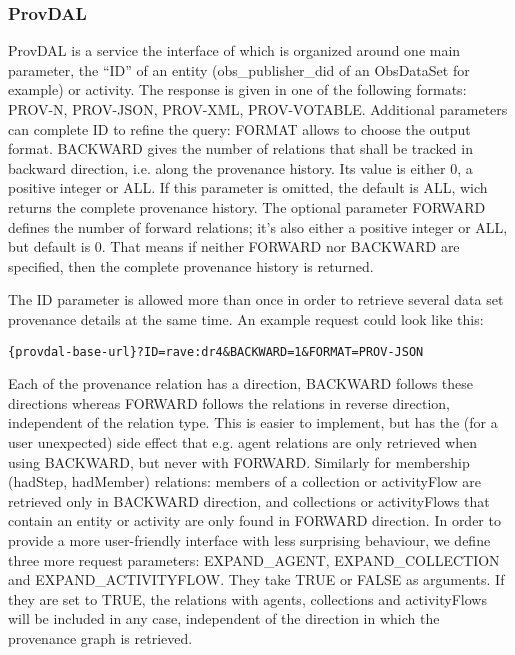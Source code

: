 \subsubsection{ProvDAL}
ProvDAL is a service the interface of which is organized around one main parameter, the ``ID'' of an entity (obs\_publisher\_did of an ObsDataSet for example) or activity. The response is given in one of the following formats: PROV-N, PROV-JSON, PROV-XML, PROV-VOTABLE. Additional parameters can complete ID to refine the query: FORMAT allows to choose the output format. BACKWARD gives the number of relations that shall be tracked in backward direction, i.e. along the provenance history. Its value is either 0, a positive integer or ALL. If this parameter is omitted, the default is ALL, wich returns the complete provenance history.
The optional parameter FORWARD defines the number of forward relations; it's also either a positive integer or ALL, but default is 0. That means if neither FORWARD nor BACKWARD are specified, then the complete provenance history is returned.



The ID parameter is allowed more than once in order to retrieve several data set provenance details at the same time. An example request could look like this:

\begin{verbatim}
{provdal-base-url}?ID=rave:dr4&BACKWARD=1&FORMAT=PROV-JSON
\end{verbatim}

Each of the provenance relation has a direction, BACKWARD follows these directions whereas FORWARD follows the relations in reverse direction, independent of the relation type. This is easier to implement, but has the (for a user unexpected) side effect that e.g. agent relations are only retrieved when using BACKWARD, but never with FORWARD. Similarly for membership (hadStep, hadMember) relations: members of a collection or activityFlow are retrieved only in BACKWARD direction, and collections or activityFlows that contain an entity or activity are only found in FORWARD direction. In order to provide a more user-friendly interface with less surprising behaviour, we define three more request parameters: EXPAND\_AGENT, EXPAND\_COLLECTION and EXPAND\_ACTIVITYFLOW. They take TRUE or FALSE as arguments. If they are set to TRUE, the relations with agents, collections and activityFlows will be included in any case, independent of the direction in which the provenance graph is retrieved.

